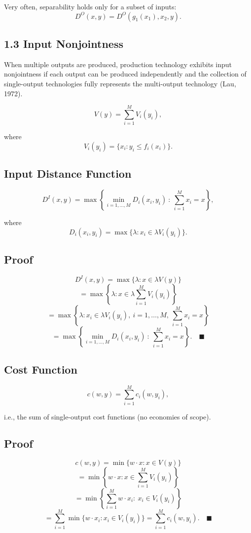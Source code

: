 Very often, separability holds only for a subset of inputs:
\[
D^O(x,y)=D^O(g_1(x_1),x_2,y).
\]

\subsection*{1.3 Input Nonjointness}

When multiple outputs are produced, production technology exhibits
input nonjointness if each output can be produced independently
and the collection of single-output technologies fully represents
the multi-output technology (Lau, 1972).

\[
V(y)=\sum_{i=1}^M V_i(y_i),
\]

where
\[
V_i(y_i)=\{x_i : y_i \le f_i(x_i)\}.
\]

\subsection*{Input Distance Function}

\[
D^I(x,y)
=
\max \left\{
\min_{i=1,\dots,M} D_i(x_i,y_i)
\ :\ \sum_{i=1}^M x_i = x
\right\},
\]

where
\[
D_i(x_i,y_i)=\max \{\lambda : x_i \in \lambda V_i(y_i)\}.
\]

\subsection*{Proof}

\[
D^I(x,y)
=
\max \{\lambda : x \in \lambda V(y)\}
\]
\[
=
\max \left\{\lambda : x \in \lambda \sum_{i=1}^M V_i(y_i)\right\}
\]
\[
=
\max \left\{
\lambda :
x_i \in \lambda V_i(y_i),\ i=1,\dots,M,\ \sum_{i=1}^M x_i = x
\right\}
\]
\[
=
\max \left\{
\min_{i=1,\dots,M} D_i(x_i,y_i)
\ :\ \sum_{i=1}^M x_i = x
\right\}.
\quad \blacksquare
\]

\subsection*{Cost Function}

\[
c(w,y)
=
\sum_{i=1}^M c_i(w,y_i),
\]

i.e., the sum of single-output cost functions (no economies of scope).

\subsection*{Proof}

\[
c(w,y)
=
\min \{w\cdot x : x \in V(y)\}
\]
\[
=
\min \left\{w\cdot x : x \in \sum_{i=1}^M V_i(y_i)\right\}
\]
\[
=
\min \left\{
\sum_{i=1}^M w\cdot x_i
:\ x_i \in V_i(y_i)
\right\}
\]
\[
=
\sum_{i=1}^M \min \{w\cdot x_i : x_i \in V_i(y_i)\}
=
\sum_{i=1}^M c_i(w,y_i).
\quad \blacksquare
\]

